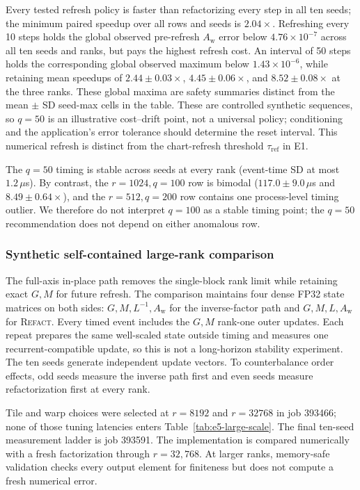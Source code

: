 \documentclass[11pt]{article}
\newcommand{\refact}{\textsc{Refact}}
\newcommand{\Aw}{A_{\mathrm w}}
\newcommand{\tref}{\tau_{\mathrm{ref}}}
\begin{document}
Every tested refresh policy is faster than refactorizing every step in all ten
seeds; the minimum paired speedup over all rows and seeds is \(2.04\times\).
Refreshing every 10 steps holds the global observed pre-refresh \(\Aw\) error below
\(4.76\times10^{-7}\) across all ten seeds and ranks, but pays the highest
refresh cost.  An interval of 50 steps holds the corresponding global
observed maximum below \(1.43\times10^{-6}\), while retaining mean speedups of
\(2.44\pm0.03\times\), \(4.45\pm0.06\times\), and
\(8.52\pm0.08\times\) at the three ranks.  These global maxima are safety
summaries distinct from the mean \(\pm\) SD seed-max cells in the table.
These are controlled synthetic sequences, so \(q=50\) is an
illustrative cost--drift point, not a universal policy; conditioning and the
application's error tolerance should determine the reset interval.  This
numerical refresh is distinct from the chart-refresh threshold \(\tref\) in
E1.

The \(q=50\) timing is stable across seeds at every rank (event-time SD at
most \(1.2\,\mu\)s).  By contrast, the \(r=1024,q=100\) row is bimodal
(\(117.0\pm9.0\,\mu\)s and \(8.49\pm0.64\times\)), and the
\(r=512,q=200\) row contains one process-level timing outlier.  We therefore
do not interpret \(q=100\) as a stable timing point; the \(q=50\)
recommendation does not depend on either anomalous row.

\subsubsection{Synthetic self-contained large-rank comparison}

The full-axis in-place path removes the single-block rank limit while retaining
exact \(G,M\) for future refresh.  The comparison maintains four dense FP32
state matrices on both sides: \(G,M,L^{-1},\Aw\) for the inverse-factor path
and \(G,M,L,\Aw\) for \refact{}.  Every timed event includes the \(G,M\)
rank-one outer updates.  Each repeat prepares the same well-scaled state
outside timing and measures one recurrent-compatible update, so this is not a
long-horizon stability experiment.  The ten seeds generate independent update
vectors.  To counterbalance order effects, odd seeds measure the inverse path
first and even seeds measure refactorization first at every rank.

Tile and warp choices were selected at \(r=8192\) and \(r=32768\) in job
393466; none of those tuning latencies enters
Table~\ref{tab:e5-large-scale}.  The final ten-seed measurement ladder is
job 393591.
The implementation is compared numerically with a fresh factorization through
\(r=32{,}768\).  At larger ranks, memory-safe validation checks every output
element for finiteness but does not compute a fresh numerical error.
\end{document}
